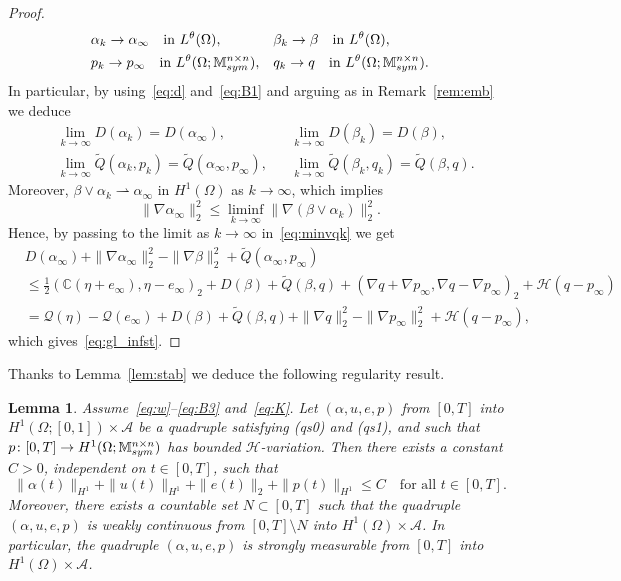 \documentclass[reqno]{amsart}
\newtheorem{lemma}[corollary]{Lemma}
\theoremstyle{definition}
\numberwithin{equation}{section}
\def\M {\mathbb M^{n\times n}_{\rm sym}}
\def\C {\mathbb C}
\begin{document}
\begin{proof}
\begin{align*}
&\alpha_k\to\alpha_\infty\quad\text{in $L^\theta(\Omega)$},& &\beta_k\to \beta \quad\text{in $L^\theta(\Omega)$},\\
&p_k\to p_\infty\quad\text{in $L^\theta(\Omega;\M)$},& &q_k\to q \quad\text{in $L^\theta(\Omega;\M)$}.
\end{align*}
In particular, by using~\eqref{eq:d} and~\eqref{eq:B1} and arguing as in Remark~\ref{rem:emb} we deduce
\begin{align*}
&\lim_{k\to\infty}D(\alpha_k)=D(\alpha_\infty),& & \lim_{k\to\infty} D(\beta_k)=D(\beta),\\
&\lim_{k\to\infty}\tilde Q(\alpha_k,p_k)=\tilde Q(\alpha_\infty,p_\infty),& & \lim_{k\to\infty}\tilde Q(\beta_k,q_k)=\tilde Q(\beta,q).
\end{align*}
Moreover, $\beta\vee \alpha_k\rightharpoonup \alpha_\infty$ in $H^1(\Omega)$ as $k\to\infty$, which implies
$$\|\nabla\alpha_\infty\|_2^2\le \liminf_{k\to\infty}\|\nabla (\beta\vee\alpha_k)\|_2^2.$$
Hence, by passing to the limit as $k\to\infty$ in~\eqref{eq:minvqk} we get
\begin{align*}
&D(\alpha_\infty)+\|\nabla \alpha_\infty\|_2^2-\|\nabla \beta\|_2^2+\tilde Q(\alpha_\infty,p_\infty)\\
&\le\frac{1}{2}(\C(\eta+e_\infty),\eta-e_\infty)_2+D(\beta)+\tilde Q(\beta,q)+(\nabla q+\nabla p_\infty,\nabla q-\nabla p_\infty)_2+\mathcal H(q-p_\infty)\\
&=\mathcal Q(\eta)-\mathcal Q(e_\infty)+D(\beta)+\tilde Q(\beta,q)+\|\nabla q\|_2^2-\|\nabla p_\infty\|_2^2+\mathcal H(q-p_\infty),
\end{align*}
which gives~\eqref{eq:gl_infst}.
\end{proof}

Thanks to Lemma~\ref{lem:stab} we deduce the following regularity result.

\begin{lemma}\label{lem:measurability}
Assume~\eqref{eq:w}--\eqref{eq:B3} and~\eqref{eq:K}. Let $(\alpha,u,e,p)$ from $[0,T]$ into $H^1(\Omega;[0,1])\times\mathcal A$ be a quadruple satisfying {\em (qs0)} and {\em (qs1)}, and such that $p\colon [0,T]\to H^1(\Omega;\M)$ has bounded $\mathcal H$-variation. Then there exists a constant $C>0$, independent on $t\in[0,T]$, such that
\begin{equation}\label{eq:unif_bound}
\|\alpha(t)\|_{H^1}+\|u(t)\|_{H^1}+\|e(t)\|_2+\|p(t)\|_{H^1}\le C\quad\text{for all $t\in[0,T]$}.
\end{equation}
Moreover, there exists a countable set $N\subset [0,T]$ such that the quadruple $(\alpha,u,e,p)$ is weakly continuous from $[0,T]\setminus N$ into $H^1(\Omega)\times \mathcal A$. In particular, the quadruple $(\alpha,u,e,p)$ is strongly measurable from $[0,T]$ into $H^1(\Omega)\times \mathcal A$.
\end{lemma}
\end{document}
